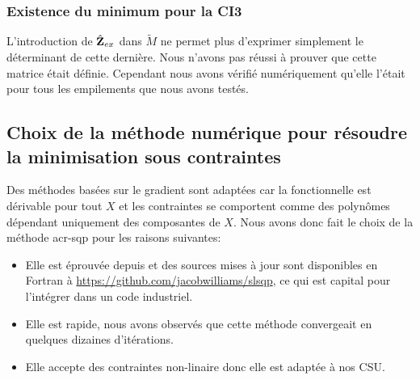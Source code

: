 \subsubsection{Existence du minimum pour la CI3}

  L'introduction de \(\hat{\mathbf{Z}}_{ex}\) dans \(\tilde M\) ne permet plus d'exprimer simplement le déterminant de cette dernière. Nous n'avons pas réussi à prouver que cette matrice était définie. Cependant nous avons vérifié numériquement qu'elle l'était pour tous les empilements que nous avons testés.


\subsection{Choix de la méthode numérique pour résoudre la minimisation sous contraintes}

  Des méthodes basées sur le gradient sont adaptées car la fonctionnelle est dérivable pour tout \(X\) et les contraintes se comportent comme des polynômes dépendant uniquement des composantes de \(X\). Nous avons donc fait le choix de la méthode \gls{acr-sqp} pour les raisons suivantes:
 
  \begin{itemize}
    \item Elle est éprouvée depuis \cite{kraft_software_1988} et des sources mises à jour sont disponibles en Fortran à \url{https://github.com/jacobwilliams/slsqp}, ce qui est capital pour l'intégrer dans un code industriel.
    \item Elle est rapide, nous avons observés que cette méthode convergeait en quelques dizaines d'itérations.
    \item Elle accepte des contraintes non-linaire donc elle est adaptée à nos CSU.
  \end{itemize}
